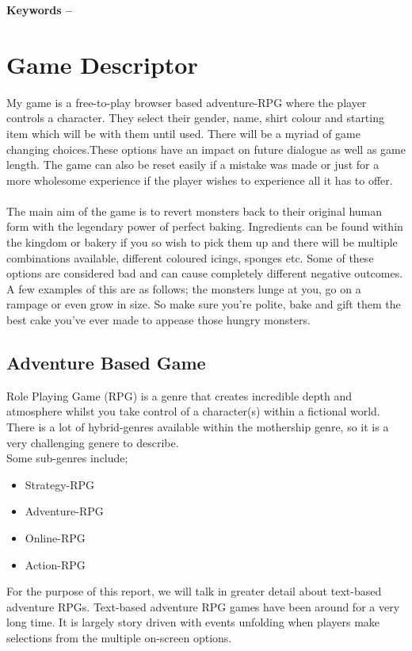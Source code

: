 \documentclass[10pt, a4paper]{article}
\title{\mytitle}
\author{\myauthor\hspace{1em}\\\contact\\Edinburgh Napier University\hspace{0.5em}-\hspace{0.5em}\mymodule}
\date{}
\begin{document}
    \maketitle
    \begin{abstract}
        This report is going to cover multiple design aspects for my game, Daedalus Delicatessen. The sections of this report cover the following; Game Descriptor, Methodologies, Features, Navigation Tree and User Interface.
    \end{abstract}
    
    \textbf{Keywords -- }{\mykeywords}
    
    \section{Game Descriptor}
	My game is a free-to-play browser based adventure-RPG where the player controls a character. They select their gender,
	name, shirt colour and starting item which will be with them until used. There will be a myriad of game changing choices.These options have an impact on future dialogue as well as game length. The game can also be reset easily if a mistake was made or just for a more wholesome experience if the player wishes to experience all it has to offer. \\
	\\
    The main aim of the game is to revert monsters back to their original human form with the legendary power of perfect baking. Ingredients can be found within the kingdom or bakery if you so wish to pick them up and there will be multiple combinations available, different coloured icings, sponges etc. Some of these options are considered bad and can cause completely different negative outcomes. A few examples of this are as follows; the monsters lunge at you, go on a rampage or even grow in size. So make sure you're polite, bake and gift them the best cake you've ever made to appease those hungry monsters.
    
	\subsection{Adventure Based Game}
	Role Playing Game (RPG) is a genre that creates incredible depth and atmosphere whilst you take control of a character(s)
	within a fictional world. There is a lot of hybrid-genres available within the mothership genre, so it is a very
	challenging genere to describe.\\
	Some sub-genres include; 
	\begin{itemize}
		\item Strategy-RPG
		\item Adventure-RPG
		\item Online-RPG
		\item Action-RPG
	\end{itemize}
	For the purpose of this report, we will talk in greater detail about text-based adventure RPGs.
	Text-based adventure RPG games have been around for a very long time. It is largely story driven
	with events unfolding when players make selections from the multiple on-screen options.
	
\end{document}
